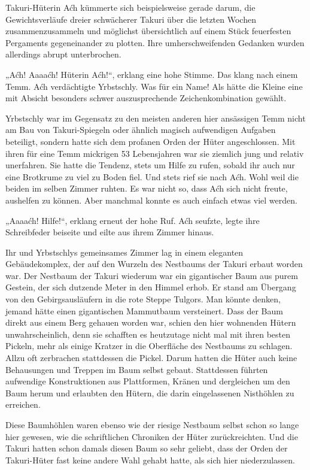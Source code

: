 Takuri-Hüterin Aćh kümmerte sich beispielsweise gerade darum, die Gewichtsverläufe dreier schwächerer Takuri über die letzten Wochen zusammenzusammeln und möglichst übersichtlich auf einem Stück feuerfesten Pergaments gegeneinander zu plotten. Ihre umherschweifenden Gedanken wurden allerdings abrupt unterbrochen.

„Aćh! Aaaaćh! Hüterin Aćh!“, erklang eine hohe Stimme. Das klang nach einem Temm. Aćh verdächtigte Yrbstschly. Was für ein Name! Als hätte die Kleine eine mit Absicht besonders schwer auszusprechende Zeichenkombination gewählt.

Yrbstschly war im Gegensatz zu den meisten anderen hier ansässigen Temm nicht am Bau von Takuri-Spiegeln oder ähnlich magisch aufwendigen Aufgaben beteiligt, sondern hatte sich dem profanen Orden der Hüter angeschlossen. Mit ihren für eine Temm mickrigen 53 Lebensjahren war sie ziemlich jung und relativ unerfahren. Sie hatte die Tendenz, stets um Hilfe zu rufen, sobald ihr auch nur eine Brotkrume zu viel zu Boden fiel. Und stets rief sie nach Aćh. Wohl weil die beiden im selben Zimmer ruhten. Es war nicht so, dass Aćh sich nicht freute, aushelfen zu können. Aber manchmal konnte es auch einfach etwas viel werden.

„Aaaaćh! Hilfe!“, erklang erneut der hohe Ruf. Aćh seufzte, legte ihre Schreibfeder beiseite und eilte aus ihrem Zimmer hinaus.

Ihr und Yrbstschlys gemeinsames Zimmer lag in einem eleganten Gebäudekomplex, der auf den Wurzeln des Nestbaums der Takuri erbaut worden war. Der Nestbaum der Takuri wiederum war ein gigantischer Baum aus purem Gestein, der sich dutzende Meter in den Himmel erhob. Er stand am Übergang von den Gebirgsausläufern in die rote Steppe Tulgors. Man könnte denken, jemand hätte einen gigantischen Mammutbaum versteinert. Dass der Baum direkt aus einem Berg gehauen worden war, schien den hier wohnenden Hütern unwahrscheinlich, denn sie schafften es heutzutage nicht mal mit ihren besten Pickeln, mehr als einige Kratzer in die Oberfläche des Nestbaums zu schlagen. Allzu oft zerbrachen stattdessen die Pickel. Darum hatten die Hüter auch keine Behausungen und Treppen im Baum selbst gebaut. Stattdessen führten aufwendige Konstruktionen aus Plattformen, Kränen und dergleichen um den Baum herum und erlaubten den Hütern, die darin eingelassenen Nisthöhlen zu erreichen.

Diese Baumhöhlen waren ebenso wie der riesige Nestbaum selbst schon so lange hier gewesen, wie die schriftlichen Chroniken der Hüter zurückreichten. Und die Takuri hatten schon damals diesen Baum so sehr geliebt, dass der Orden der Takuri-Hüter fast keine andere Wahl gehabt hatte, als sich hier niederzulassen.

